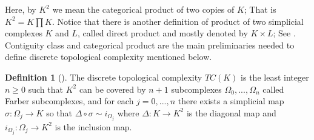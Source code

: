 \documentclass[preprint,11pt %
]{hjm1}
\theoremstyle{definition}
\newtheorem{definition}[theorem]{Definition}
\begin{document}
\noindent
Here, by $K^2$ we mean the categorical product of two copies of $K$; That is $K^2 = K \prod K$. 
Notice that there is another definition of product of two simplicial complexes $K$ and $L$, called direct product and mostly denoted by $K\times L$; See \cite{dis}. Contiguity class and categorical product  are the main preliminaries needed to define discrete topological complexity mentioned below. 


\begin{definition}[\cite{dis}]\label{de2.2}
The discrete topological complexity $TC(K)$ is the least integer $n\geq 0$ such that $K^2$ can be covered by $n+1$ subcomplexes $\Omega _0,...,\Omega _n$ called Farber subcomplexes, and for each $j=0,...,n$ there exists a simplicial map $\sigma :\Omega _j\to K$ so that $\Delta \circ \sigma\sim i_{\Omega _j}$ where $\Delta :K\to K^2$ is the diagonal map and $i_{\Omega _j}:\Omega _j\to K^2$ is the inclusion map.
\end{definition}
\end{document}
